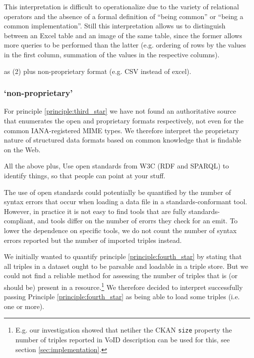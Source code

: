 This interpretation is difficult to operationalize due to the variety of
 relational operators and the absence of a formal definition of
 ``being common'' or ``being a common implementation''.
Still this interpretation allows us to distinguish between
 an Excel table and an image of the same table,
 since the former allows more queries to be performed than the latter
 (e.g. ordering of rows by the values in the first column,
  summation of the values in the respective columns).

\begin{principle}
  \label{principle:third_star}
  as (2) plus non-proprietary format (e.g. CSV instead of excel).
\end{principle}

\subsubsection*{`non-proprietary'}

For principle \ref{principle:third_star} we have not found
 an authoritative source that
 enumerates the open and proprietary formats respectively,
 not even for the common IANA-registered MIME types.
We therefore interpret the proprietary nature of structured data formats
 based on common knowledge that is findable on the Web.

\begin{principle}
  \label{principle:fourth_star}
  All the above plus, Use open standards from W3C (RDF and SPARQL)
   to identify things, so that people can point at your stuff.
\end{principle}

The use of open standards could  potentially be quantified by the number of
 syntax errors that occur when loading
 a data file in a standards-conformant tool.
However, in practice it is not easy to find tools that are fully
 standards-compliant, and tools differ on the number of erorrs
 they check for an emit.
To lower the dependence on specific tools,
 we do not count the number of syntax errors reported
 but the number of imported triples instead.

We initially wanted to quantify principle \ref{principle:fourth_star}
 by stating that all triples in a dataset ought to be parsable
 and loadable in a triple store.
But we could not find a reliable method for assessing
 the number of triples that is (or should be) present
 in a resource.\footnote{E.g. our investigation showed that
   netiher the CKAN \texttt{size} property
   the number of triples reported in VoID description
   can be used for this, see section \ref{sec:implementation}.}
We therefore decided to interpret successfully passing
 Principle \ref{principle:fourth_star} as
 being able to load some triples (i.e. one or more).

